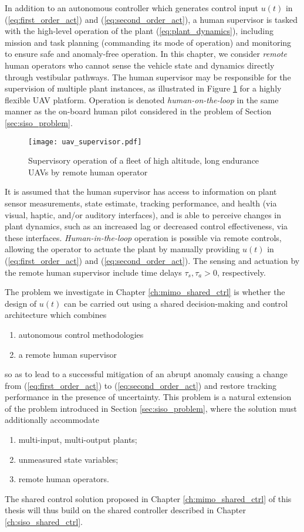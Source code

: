 In addition to an autonomous controller which generates control input $u(t)$ in (\ref{eq:first_order_act}) and (\ref{eq:second_order_act}), a human supervisor is tasked with the high-level operation of the plant (\ref{eq:plant_dynamics}), including mission and task planning (commanding its mode of operation) and monitoring to ensure safe and anomaly-free operation. In this chapter, we consider \textit{remote} human operators who cannot sense the vehicle state and dynamics directly through vestibular pathways. The human supervisor may be responsible for the supervision of multiple plant instances, as illustrated in Figure \ref{fig:uav_supervisor} for a highly flexible UAV platform. Operation is denoted \textit{human-on-the-loop} in the same manner as the on-board human pilot considered in the problem of Section \ref{sec:siso_problem}. 

\begin{figure}[htbp]
	\centering
	\texttt{[image: uav\_supervisor.pdf]}
	\caption{Supervisory operation of a fleet of high altitude, long endurance UAVs by remote human operator}
	\label{fig:uav_supervisor}
\end{figure}

It is assumed that the human supervisor has access to information on plant sensor measurements, state estimate, tracking performance, and health (via visual, haptic, and/or auditory interfaces), and is able to perceive changes in plant dynamics, such as an increased lag or decreased control effectiveness, via these interfaces.  \textit{Human-in-the-loop} operation is possible via remote controls, allowing the operator to actuate the plant by manually providing $u(t)$ in (\ref{eq:first_order_act}) and (\ref{eq:second_order_act}). The sensing and actuation by the remote human supervisor include time delays $\tau_s, \tau_a > 0$, respectively.

The problem we investigate in Chapter \ref{ch:mimo_shared_ctrl} is whether the design of $u(t)$ can be carried out using a shared decision-making and control architecture which combines
\begin{enumerate}[label=(\alph*)]
	\item autonomous control methodologies
	\item a remote human supervisor
\end{enumerate}
so as to lead to a successful mitigation of an abrupt anomaly causing a change from (\ref{eq:first_order_act}) to (\ref{eq:second_order_act}) and restore tracking performance in the presence of uncertainty. This problem is a natural extension of the problem introduced in Section \ref{sec:siso_problem}, where the solution must additionally accommodate
\begin{enumerate}[label=(\roman*)]
	\item multi-input, multi-output plants;
	\item unmeasured state variables;
	\item remote human operators.
\end{enumerate}
The shared control solution proposed in Chapter \ref{ch:mimo_shared_ctrl} of this thesis will thus build on the shared controller described in Chapter \ref{ch:siso_shared_ctrl}.
  
